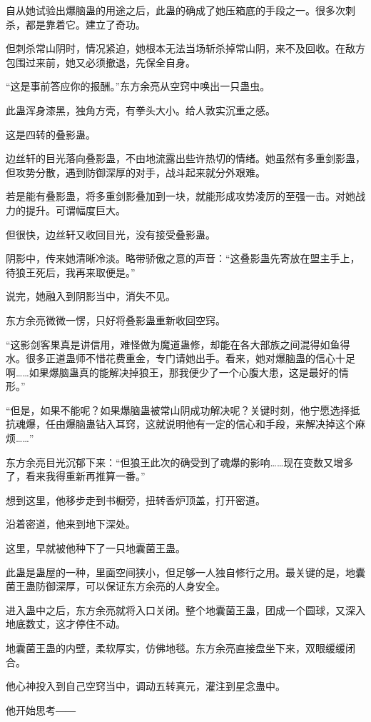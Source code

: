 \begin{this_body}
自从她试验出爆脑蛊的用途之后，此蛊的确成了她压箱底的手段之一。很多次刺杀，都是靠着它。建立了奇功。

但刺杀常山阴时，情况紧迫，她根本无法当场斩杀掉常山阴，来不及回收。在敌方包围过来前，她又必须撤退，先保全自身。

“这是事前答应你的报酬。”东方余亮从空窍中唤出一只蛊虫。

此蛊浑身漆黑，独角方壳，有拳头大小。给人敦实沉重之感。

这是四转的叠影蛊。

边丝轩的目光落向叠影蛊，不由地流露出些许热切的情绪。她虽然有多重剑影蛊，但攻势分散，遇到防御深厚的对手，战斗起来就分外艰难。

若是能有叠影蛊，将多重剑影叠加到一块，就能形成攻势凌厉的至强一击。对她战力的提升。可谓幅度巨大。

但很快，边丝轩又收回目光，没有接受叠影蛊。

阴影中，传来她清晰冷淡。略带骄傲之意的声音：“这叠影蛊先寄放在盟主手上，待狼王死后，我再来取便是。”

说完，她融入到阴影当中，消失不见。

东方余亮微微一愣，只好将叠影蛊重新收回空窍。

“这影剑客果真是讲信用，难怪做为魔道蛊修，却能在各大部族之间混得如鱼得水。很多正道蛊师不惜花费重金，专门请她出手。看来，她对爆脑蛊的信心十足啊……如果爆脑蛊真的能解决掉狼王，那我便少了一个心腹大患，这是最好的情形。”

“但是，如果不能呢？如果爆脑蛊被常山阴成功解决呢？关键时刻，他宁愿选择抵抗魂爆，任由爆脑蛊钻入耳窍，这就说明他有一定的信心和手段，来解决掉这个麻烦……”

东方余亮目光沉郁下来：“但狼王此次的确受到了魂爆的影响……现在变数又增多了，看来我得重新再推算一番。”

想到这里，他移步走到书橱旁，扭转香炉顶盖，打开密道。

沿着密道，他来到地下深处。

这里，早就被他种下了一只地囊菌王蛊。

此蛊是蛊屋的一种，里面空间狭小，但足够一人独自修行之用。最关键的是，地囊菌王蛊防御深厚，可以保证东方余亮的人身安全。

进入蛊中之后，东方余亮就将入口关闭。整个地囊菌王蛊，团成一个圆球，又深入地底数丈，这才停住不动。

地囊菌王蛊的内壁，柔软厚实，仿佛地毯。东方余亮直接盘坐下来，双眼缓缓闭合。

他心神投入到自己空窍当中，调动五转真元，灌注到星念蛊中。

他开始思考――


\end{this_body}
